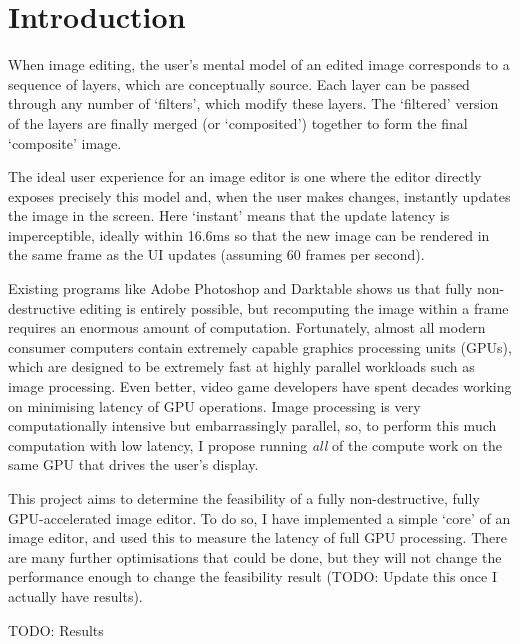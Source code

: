 \documentclass[12pt]{article}
\begin{document}
\pagebreak

\tableofcontents



\pagebreak

\section{Introduction}

When image editing, the user's mental model of an edited image corresponds to a sequence of layers,
which are conceptually source.  Each layer can be passed through any number of `filters', which
modify these layers.  The `filtered' version of the layers are finally merged (or `composited')
together to form the final `composite' image.

The ideal user experience for an image editor is one where the editor directly exposes precisely
this model and, when the user makes changes, instantly updates the image in the screen.  Here
`instant' means that the update latency is imperceptible, ideally within 16.6ms so that the new
image can be rendered in the same frame as the UI updates (assuming 60 frames per second).

Existing programs like Adobe Photoshop and Darktable shows us that fully non-destructive editing is
entirely possible, but recomputing the image within a frame requires an enormous amount of
computation.  Fortunately, almost all modern consumer computers contain extremely capable graphics
processing units (GPUs), which are designed to be extremely fast at highly parallel workloads such
as image processing.  Even better, video game developers have spent decades working on minimising
latency of GPU operations.  Image processing is very computationally intensive but embarrassingly
parallel, so, to perform this much computation with low latency, I propose running \emph{all} of the
compute work on the same GPU that drives the user's display.

This project aims to determine the feasibility of a fully non-destructive, fully GPU-accelerated
image editor.  To do so, I have implemented a simple `core' of an image editor, and used this to
measure the latency of full GPU processing.  There are many further optimisations that could be
done, but they will not change the performance enough to change the feasibility result (TODO: Update
this once I actually have results).

TODO: Results



\pagebreak
\end{document}
